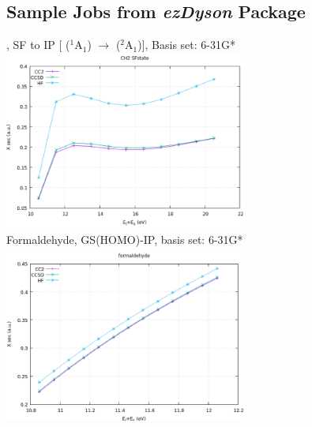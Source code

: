 \subsection*{Sample Jobs from \textit{ezDyson} Package}
\vfill
{}, SF to IP [ ($^1$A$_1$) $\to$  ($^2$A$_1$)], Basis set: 6-31G*
\includegraphics[width=0.6\textwidth]{chapters/appendix/image/Picture1.png}\\
\vfill
Formaldehyde, GS(HOMO)-IP, basis set: 6-31G*
\includegraphics[width=0.6\textwidth]{chapters/appendix/image/Picture2.png}\\
\vfill
\clearpage

